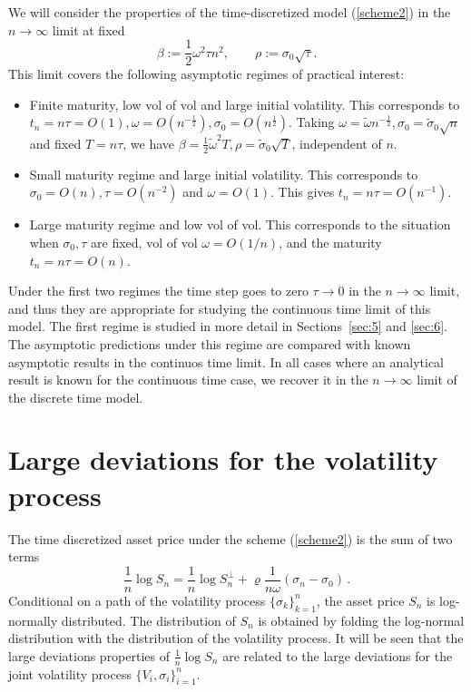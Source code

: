 \documentclass[11pt]{article}
\numberwithin{equation}{section}
\theoremstyle{plain}
\begin{document}
We will consider the properties of the time-discretized model (\ref{scheme2})
in  the $n \to \infty$ limit at fixed 
\begin{equation}\label{betarho}
\beta:= \frac{1}{2}\omega^{2}\tau n^{2},
\qquad
\rho:=\sigma_{0}\sqrt{\tau}.
\end{equation} 
This limit covers the following
asymptotic regimes of practical interest:
\begin{itemize}

\item Finite maturity, low vol of vol and large initial volatility.
This corresponds to $t_n = n\tau = O(1), \omega = O(n^{-\frac12}), 
\sigma_0 = O(n^\frac12)$. Taking 
$\omega=\tilde \omega n^{-\frac12},
\sigma_0 = \tilde \sigma_0 \sqrt{n}$ and fixed $T=n\tau$, we have
$\beta=\frac12 \tilde\omega^2 T, \rho = \tilde \sigma_0 \sqrt{T}$, 
independent of $n$.

\item Small maturity regime and large initial volatility. This corresponds 
to $\sigma_0 = O(n), \tau =O(n^{-2})$ and $\omega=O(1)$. This gives
$t_n =n\tau=O(n^{-1})$.

\item Large maturity regime and low vol of vol. This corresponds to the
situation when $\sigma_0,\tau$ are fixed, vol of vol $\omega=O(1/n)$,
and the maturity $t_n = n\tau =O(n)$.

\end{itemize}

Under the first two regimes the time step goes to 
zero $\tau\to 0$ in the $n\to \infty$ limit, and thus they are appropriate
for studying the continuous time limit of this model. The first regime is 
studied in more detail in Sections~\ref{sec:5} and \ref{sec:6}. 
The asymptotic predictions under this regime are compared with known asymptotic
results in the continuos time limit. In all cases where an analytical result is 
known for the continuous time case, we recover it in the $n\to \infty$ limit 
of the discrete time model.


\section{Large deviations for the volatility process}
\label{sec:3}

The time discretized asset price under the scheme (\ref{scheme2}) is the sum 
of two terms
\begin{equation}\label{sum12}
\frac{1}{n} \log S_n = \frac{1}{n}\log S_n^\perp + 
\varrho \frac{1}{n\omega} (\sigma_n - \sigma_0) \,.
\end{equation}
Conditional on a path of the volatility process 
$\{\sigma_k\}_{k=1}^n$, the
asset price $S_n$ is log-normally distributed. The distribution of $S_n$
is obtained by folding the log-normal distribution with the distribution
of the volatility process. It will be seen that the large deviations
properties of $\frac{1}{n} \log S_n$ are related to the large deviations
for the joint volatility process $\{ V_i, \sigma_i\}_{i=1}^n$.
\end{document}

